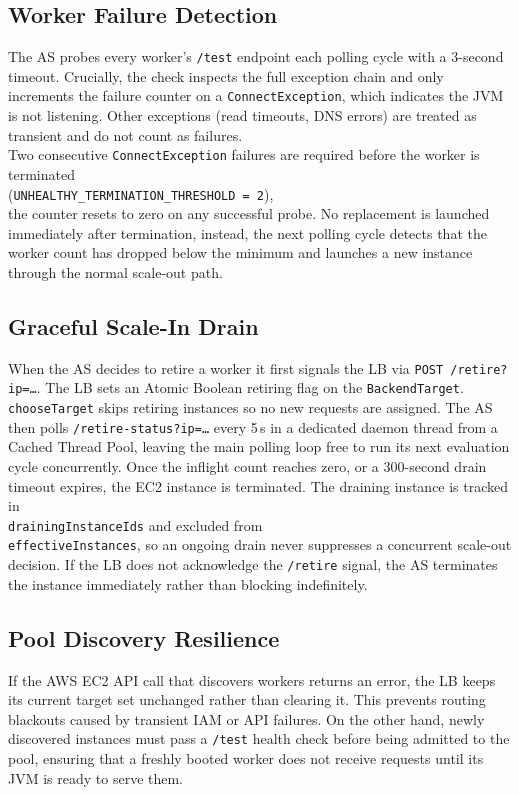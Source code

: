 \documentclass[10pt]{article}
\begin{document}
\subsection{Worker Failure Detection}\label{sec:ft:failure}
The AS probes every worker's \texttt{/test} endpoint each polling cycle with a
3-second timeout. Crucially, the check inspects the full exception chain and
only increments the failure counter on a \texttt{ConnectException}, which
indicates the JVM is not listening. Other exceptions (read timeouts, DNS
errors) are treated as transient and do not count as failures. \\ Two consecutive
\texttt{ConnectException} failures are required before the worker is terminated \\
(\texttt{UNHEALTHY\_TERMINATION\_THRESHOLD = 2}), \\ the counter resets to zero
on any successful probe. No replacement is launched immediately after termination, instead, the next
polling cycle detects that the worker count has dropped below the minimum and
launches a new instance through the normal scale-out path.

\subsection{Graceful Scale-In Drain}\label{sec:ft:drain}
When the AS decides to retire a worker it first signals the LB via
\texttt{POST /retire?ip=\ldots}. The LB sets an Atomic Boolean retiring
flag on the \texttt{BackendTarget}. \\
\texttt{chooseTarget} skips retiring
instances so no new requests are assigned. The AS then polls
\texttt{/retire-status?ip=\ldots} every 5\,s in a dedicated daemon thread from a
Cached Thread Pool, leaving the main polling loop free to run its next
evaluation cycle concurrently. Once the inflight count reaches zero, or a
300-second drain timeout expires, the EC2 instance is terminated. The
draining instance is tracked in \\ \texttt{drainingInstanceIds} and excluded from \\
\texttt{effectiveInstances}, so an ongoing drain never suppresses a concurrent
scale-out decision. If the LB does not acknowledge the \texttt{/retire} signal, the AS terminates the instance immediately rather than
blocking indefinitely.

\subsection{Pool Discovery Resilience}\label{sec:ft:discovery}
If the AWS EC2 API call that discovers workers returns an error, the LB keeps
its current target set unchanged rather than clearing it. This prevents routing
blackouts caused by transient IAM or API failures. On the other hand, newly discovered
instances must pass a \texttt{/test} health check before being admitted to the
pool, ensuring that a freshly booted worker does not receive requests until
its JVM is ready to serve them.
\end{document}
